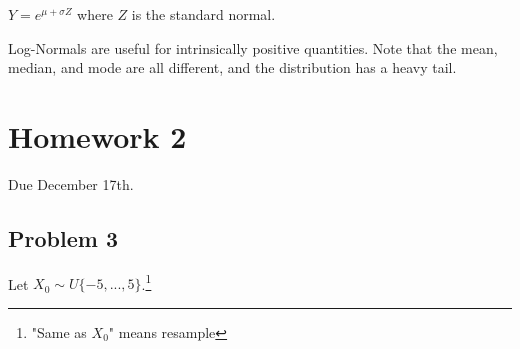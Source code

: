 \documentclass[a4paper]{article}
\begin{document}
$Y=e^{\mu+\sigma Z}$ where $Z$ is the standard normal.

Log-Normals are useful for intrinsically positive quantities. Note that the mean, median, and mode are all different, and the distribution has a heavy tail.

\section{Homework 2}
Due December 17th.

\subsection{Problem 3}
Let $X_0 \sim U\{-5,...,5\}$.\footnote{"Same as $X_0$" means resample}
\end{document}
